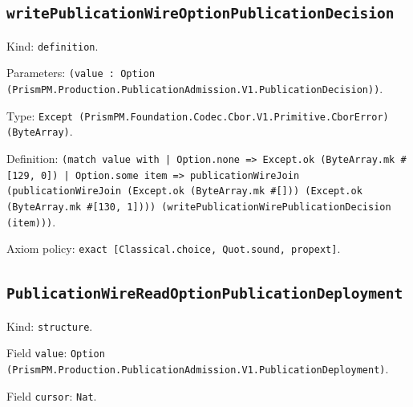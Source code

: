 \documentclass[11pt]{article}
\begin{document}
\subsection*{\texttt{writePublicationWireOptionPublicationDecision}}
\noindent Kind: \texttt{definition}.\par
\noindent Parameters: \texttt{(value : Option (PrismPM.Production.PublicationAdmission.V1.PublicationDecision))}.\par
\noindent Type: \texttt{Except (PrismPM.Foundation.Codec.Cbor.V1.Primitive.CborError) (ByteArray)}.\par
\noindent Definition: \texttt{(match value with | Option.none => Except.ok (ByteArray.mk \#[129, 0]) | Option.some item => publicationWireJoin (publicationWireJoin (Except.ok (ByteArray.mk \#[])) (Except.ok (ByteArray.mk \#[130, 1]))) (writePublicationWirePublicationDecision (item)))}.\par
\noindent Axiom policy: \texttt{exact [Classical.choice, Quot.sound, propext]}.\par
\subsection*{\texttt{PublicationWireReadOptionPublicationDeployment}}
\noindent Kind: \texttt{structure}.\par
\noindent Field \texttt{value}: \texttt{Option (PrismPM.Production.PublicationAdmission.V1.PublicationDeployment)}.\par
\noindent Field \texttt{cursor}: \texttt{Nat}.\par
\end{document}
